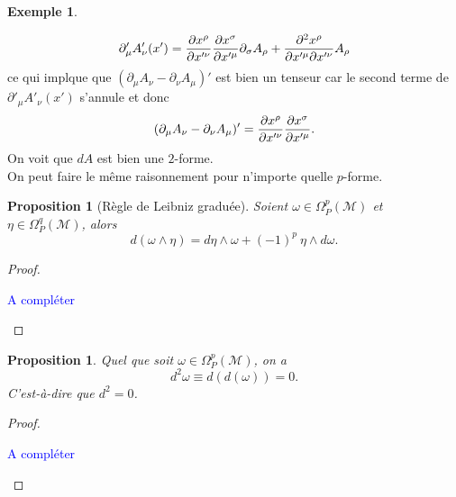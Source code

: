 \documentclass[a4paper,11pt]{report}
\theoremstyle{definition}
\theoremstyle{plain}
\newtheorem{prop}[thm]{Proposition}
\theoremstyle{definition}
\newtheorem{exmp}{Exemple}[chapter]
\theoremstyle{remark}
\newcommand{\comp}{\begin{center}\textcolor{blue}{A compléter}\end{center}}
\newcommand{\M}{\mathscr{M}}
\newcommand{\p}{\partial}
\begin{document}
\begin{exmp}
\begin{itemize}[label = \textbullet]
\begin{equation}
                            \p'_\mu A'_\nu(x') = \pdv{x^\rho}{x'^\nu}\pdv{x^\sigma}{x'^\mu}\p_\sigma A_\rho + \pdv{x^\rho}{x'^\mu}{x'^\nu} A_\rho
                        \end{equation}
                        ce qui implque que $(\p_\mu A_\nu-\p_\nu A_\mu)'$ est bien un tenseur car le second terme de $\p'_\mu A'_\nu(x')$ s'annule et donc
                        \begin{equation}
                            (\p_\mu A_\nu-\p_\nu A_\mu)' = \pdv{x^\rho}{x'^\nu}\pdv{x^\sigma}{x'^\mu}(\p_\sigma A_\rho-\p_\rho A_\sigma).
                        \end{equation}
                        On voit que $dA$ est bien une $2$-forme.\\
                        
                        On peut faire le même raisonnement pour n'importe quelle $p$-forme.
                \end{itemize}
            \end{exmp}
            
            \begin{prop}[Règle de Leibniz graduée]
                Soient $\omega\in\Omega_P^p(\M)$ et $\eta\in\Omega_P^q(\M)$, alors
                \begin{equation}
                    d(\omega\wedge\eta) = d\eta\wedge\omega+(-1)^{p}~\eta\wedge d\omega.
                \end{equation}
            \end{prop}
            
            \begin{proof}${}$\\
                \comp
            \end{proof}
            
            \begin{prop}
                Quel que soit $\omega\in\Omega_P^p(\M)$, on a 
                \begin{equation}
                    d^2\omega \equiv d(d(\omega)) = 0.
                \end{equation}
                C'est-à-dire que $d^2 = 0$.
            \end{prop}
            
            \begin{proof}${}$\\
                \comp
            \end{proof}
            
\end{document}
